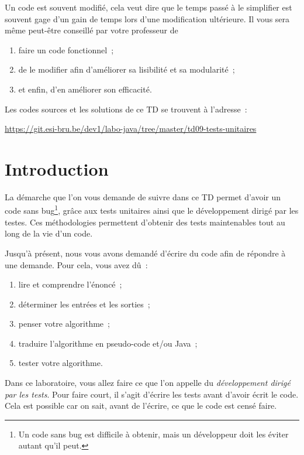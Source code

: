 \documentclass[a4paper,11pt]{article}
\date{2018 -- 2019}
\newcommand{\publicbasepath}
{https://git.esi-bru.be/dev1/labo-java/tree/master/td09-tests-unitaires}
\begin{document}
\entete
\titre
{}
\lastedit


	Un code est souvent modifié, cela veut dire que le temps passé à le simplifier est souvent gage d’un gain de temps lors d’une modification ultérieure. Il vous sera même peut-être conseillé par votre professeur de 
	\begin{enumerate}
		\item faire un code fonctionnel~;
		\item de le modifier afin d’améliorer sa lisibilité et sa modularité~;
		\item et enfin, d’en améliorer son efficacité.
	\end{enumerate} 
	
		Les codes sources et les solutions de ce TD se trouvent à l'adresse~: 
	
	\url{\publicbasepath}	

		 
	\tableofcontents

	\newpage




\section{Introduction}

	La démarche que l'on vous demande de suivre dans ce TD permet d'avoir un code sans bug\footnote{Un code sans bug est difficile à obtenir, mais un développeur doit les éviter autant qu'il peut.}, grâce aux tests unitaires ainsi que le développement dirigé par les testes. Ces méthodologies permettent d'obtenir des tests maintenables tout au long de la vie d'un code.

	Jusqu'à présent, nous vous avons demandé d'écrire du code afin de répondre à une demande. Pour cela, vous avez dû~:
	\begin{enumerate}
		\item lire et comprendre l'énoncé~;
		\item déterminer les entrées et les sorties~;
		\item penser votre algorithme~;
		\item traduire l'algorithme en pseudo-code et/ou Java~;
		\item tester votre algorithme.
	\end{enumerate}

	Dans ce laboratoire, vous allez faire ce que l'on appelle du \emph{développement dirigé par les tests}. Pour faire court, il s'agit d'écrire les tests avant d'avoir écrit le code. Cela est possible car on sait, avant de l'écrire, ce que le code est censé faire.
\end{document}

